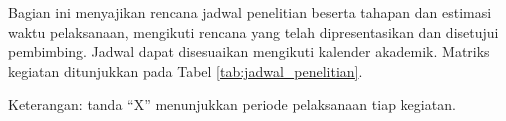 Bagian ini menyajikan rencana jadwal penelitian beserta tahapan dan estimasi waktu pelaksanaan, mengikuti rencana yang telah dipresentasikan dan disetujui pembimbing. Jadwal dapat disesuaikan mengikuti kalender akademik. Matriks kegiatan ditunjukkan pada Tabel \ref{tab:jadwal_penelitian}.

\begin{table}[!h]
    \centering
    \caption{Jadwal Kegiatan Penelitian}
    \label{tab:jadwal_penelitian}
\end{table}

Keterangan: tanda ``X'' menunjukkan periode pelaksanaan tiap kegiatan. %
